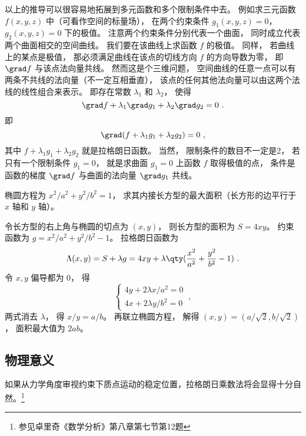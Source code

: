 以上的推导可以很容易地拓展到多元函数和多个限制条件中去。 例如求三元函数 $f(x,y,z)$ 中（可看作空间的标量场）， 在两个约束条件 $g_1(x,y,z) = 0$， $g_2(x,y,z) = 0$ 下的极值。 注意两个约束条件分别代表一个曲面， 同时成立代表两个曲面相交的空间曲线。 我们要在该曲线上求函数 $f$ 的极值。 同样， 若曲线上的某点是极值， 那必须满足曲线在该点的切线方向 $f$ 的方向导数为零， 即 $\grad f$ 与该点法向量共线。 然而这是个三维问题， 空间曲线的任意一点可以有两条不共线的法向量（不一定互相垂直）， 该点的任何其他法向量可以由这两个法线的线性组合来表示。 即存在常数 $\lambda_1$ 和 $\lambda_2$， 使得
\begin{equation}
\grad f + \lambda_1 \grad g_1 + \lambda_2 \grad g_2 = 0~.
\end{equation}
即
\begin{equation}
\grad (f + \lambda_1 g_1 + \lambda_2 g_2) = 0~,
\end{equation}
其中 $f + \lambda_1 g_1 + \lambda_2 g_2$ 就是拉格朗日函数。 当然， 限制条件的数目不一定是2， 若只有一个限制条件 $g_1 = 0$， 就是求曲面 $g_1 = 0$ 上函数 $f$ 取得极值的点， 条件是函数的梯度 $\grad f$ 与曲面的法向量 $\grad g_1$ 共线。

\begin{example}{}
椭圆方程为 $x^2/a^2 + y^2/b^2 = 1$， 求其内接长方型的最大面积（长方形的边平行于 $x$ 轴和 $y$ 轴）。

令长方型的右上角与椭圆的切点为 $(x,y)$， 则长方型的面积为 $S = 4xy$。 约束函数为 $g = x^2/a^2 + y^2/b^2 - 1$。 拉格朗日函数为
\begin{equation}
\Lambda(x,y) = S + \lambda g = 4xy + \lambda \qty(\frac{x^2}{a^2} + \frac{y^2}{b^2} - 1)~.
\end{equation}
令 $x, y$ 偏导都为 0， 得
\begin{equation}
\begin{cases}
4y + 2\lambda x/a^2 = 0\\
4x + 2\lambda y/b^2 = 0
\end{cases}~,
\end{equation}
两式消去 $\lambda$， 得 $x/y = a/b$。 再联立椭圆方程， 解得 $(x,y) = (a/\sqrt{2}, b/\sqrt{2})$， 面积最大值为 $2ab$。
\end{example}

\subsection{物理意义}

如果从力学角度审视约束下质点运动的稳定位置，拉格朗日乘数法将会显得十分自然。\footnote{参见卓里奇《数学分析》第八章第七节第12题}

